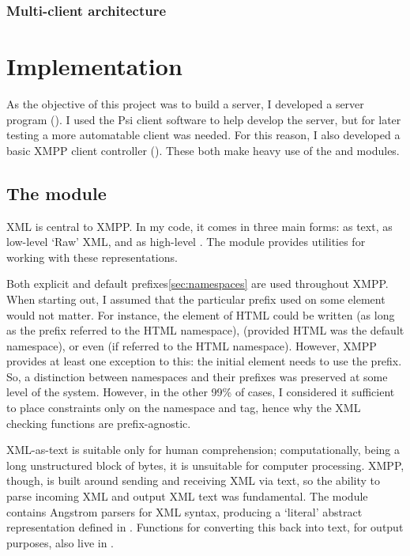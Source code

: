 \documentclass[12pt,a4paper,twoside,openright]{report}
\begin{document}
{\subsection{Multi-client architecture}


\chapter{Implementation}
As the objective of this project was to build a server, I developed a server program (). I used the Psi client software to help develop the server, but for later testing a more automatable client was needed. For this reason, I also developed a basic XMPP client controller ().
These both make heavy use of the  and  modules.

\section{The  module}\label{sec:xmlmod}
XML is central to XMPP. In my code, it comes in three main forms: as text, as low-level `Raw' XML, and as high-level . The  module provides utilities for working with these representations.

Both explicit and default prefixes\ref{sec:namespaces} are used throughout XMPP. When starting out, I assumed that the particular prefix used on some element would not matter. For instance, the  element of HTML could be written  (as long as the  prefix referred to the HTML namespace),  (provided HTML was the default namespace), or even  (if  referred to the HTML namespace). However, XMPP provides at least one exception to this: the initial  element needs to use the  prefix. So, a distinction between namespaces and their prefixes was preserved at some level of the system. However, in the other 99\% of cases, I considered it sufficient to place constraints only on the namespace and tag, hence why the XML checking functions are prefix-agnostic.

XML-as-text is suitable only for human comprehension; computationally, being a long unstructured block of bytes, it is unsuitable for computer processing. XMPP, though, is built around sending and receiving XML via text, so the ability to parse incoming XML and output XML text was fundamental. The  module contains Angstrom parsers for XML syntax, producing a `literal' abstract representation defined in . Functions for converting this back into text, for output purposes, also live in .

}
\end{document}
